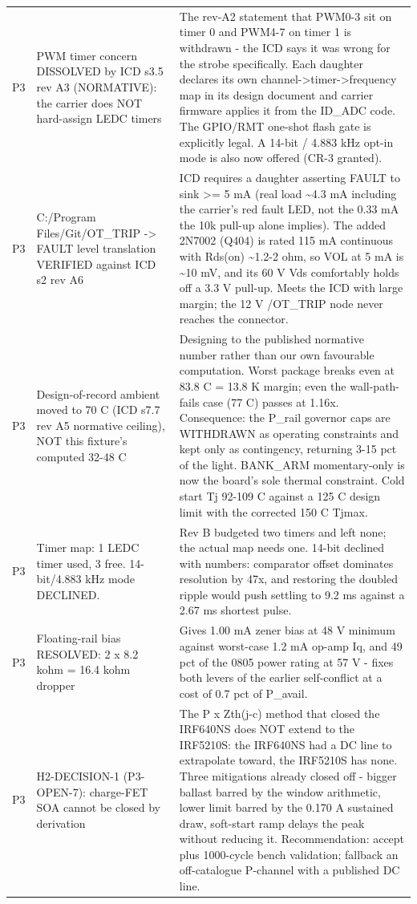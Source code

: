 \documentclass[11pt,a4paper]{article}
\begin{document}
{\begin{longtable}{lp{5.2cm}p{7.2cm}}
P3 & PWM timer concern DISSOLVED by ICD s3.5 rev A3 (NORMATIVE): the carrier does NOT hard-assign LEDC timers & The rev-A2 statement that PWM0-3 sit on timer 0 and PWM4-7 on timer 1 is withdrawn - the ICD says it was wrong for the strobe specifically. Each daughter declares its own channel-\textgreater{}timer-\textgreater{}frequency map in its design document and carrier firmware applies it from the ID\_ADC code. The GPIO/RMT one-shot flash gate is explicitly legal. A 14-bit / 4.883 kHz opt-in mode is also now offered (CR-3 granted). \\
P3 & C:/Program Files/Git/OT\_TRIP -\textgreater{} FAULT level translation VERIFIED against ICD s2 rev A6 & ICD requires a daughter asserting FAULT to sink \textgreater{}= 5 mA (real load \textasciitilde{}4.3 mA including the carrier's red fault LED, not the 0.33 mA the 10k pull-up alone implies). The added 2N7002 (Q404) is rated 115 mA continuous with Rds(on) \textasciitilde{}1.2-2 ohm, so VOL at 5 mA is \textasciitilde{}10 mV, and its 60 V Vds comfortably holds off a 3.3 V pull-up. Meets the ICD with large margin; the 12 V /OT\_TRIP node never reaches the connector. \\
P3 & Design-of-record ambient moved to 70 C (ICD s7.7 rev A5 normative ceiling), NOT this fixture's computed 32-48 C & Designing to the published normative number rather than our own favourable computation. Worst package breaks even at 83.8 C = 13.8 K margin; even the wall-path-fails case (77 C) passes at 1.16x. Consequence: the P\_rail governor caps are WITHDRAWN as operating constraints and kept only as contingency, returning 3-15 pct of the light. BANK\_ARM momentary-only is now the board's sole thermal constraint. Cold start Tj 92-109 C against a 125 C design limit with the corrected 150 C Tjmax. \\
P3 & Timer map: 1 LEDC timer used, 3 free. 14-bit/4.883 kHz mode DECLINED. & Rev B budgeted two timers and left none; the actual map needs one. 14-bit declined with numbers: comparator offset dominates resolution by 47x, and restoring the doubled ripple would push settling to 9.2 ms against a 2.67 ms shortest pulse. \\
P3 & Floating-rail bias RESOLVED: 2 x 8.2 kohm = 16.4 kohm dropper & Gives 1.00 mA zener bias at 48 V minimum against worst-case 1.2 mA op-amp Iq, and 49 pct of the 0805 power rating at 57 V - fixes both levers of the earlier self-conflict at a cost of 0.7 pct of P\_avail. \\
P3 & H2-DECISION-1 (P3-OPEN-7): charge-FET SOA cannot be closed by derivation & The P x Zth(j-c) method that closed the IRF640NS does NOT extend to the IRF5210S: the IRF640NS had a DC line to extrapolate toward, the IRF5210S has none. Three mitigations already closed off - bigger ballast barred by the window arithmetic, lower limit barred by the 0.170 A sustained draw, soft-start ramp delays the peak without reducing it. Recommendation: accept plus 1000-cycle bench validation; fallback an off-catalogue P-channel with a published DC line. \\

\end{longtable}}
\end{document}
